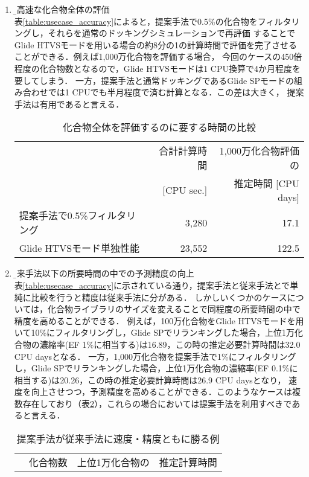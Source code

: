 \begin{enumerate}
\item \b{超高速な化合物全体の評価}\\
	表\ref{table:usecase_accuracy}によると，提案手法で0.5\%の化合物をフィルタリングし，それらを通常のドッキングシミュレーションで再評価
	することでGlide HTVSモードを用いる場合の約8分の1の計算時間で評価を完了させることができる．例えば1,000万化合物を評価する場合，
	今回のケースの450倍程度の化合物数となるので，Glide HTVSモードは1 CPU換算で4か月程度を要してしまう．
	一方，提案手法と通常ドッキングであるGlide SPモードの組み合わせでは1 CPUでも半月程度で済む計算となる．この差は大きく，
	提案手法は有用であると言える．
\begin{table}[htbp] \centering
	\caption{化合物全体を評価するのに要する時間の比較}
	\label{calc_speed_ultrafast}
	\begin{tabular}{l|rr}
	\hline
												&合計計算時間	&1,000万化合物評価の		\\ 
												&[CPU sec.]		&推定時間 [CPU days]		\\ \hline
	提案手法で0.5\%フィルタリング	&3,280				&17.1								\\
	Glide HTVSモード単独性能		&23,552				&122.5								\\ \hline
	\end{tabular}
\end{table}
\item \b{従来手法以下の所要時間の中での予測精度の向上}\\
	表\ref{table:usecase_accuracy}に示されている通り，提案手法と従来手法とで単純に比較を行うと精度は従来手法に分がある．
	しかしいくつかのケースについては，化合物ライブラリのサイズを変えることで同程度の所要時間の中で精度を高めることができる．
	例えば，100万化合物をGlide HTVSモードを用いて10\%にフィルタリングし，Glide SPでリランキングした場合，上位1万化合物の濃縮率(EF 1\%に相当する)は16.89，この時の推定必要計算時間は32.0 CPU daysとなる．
	一方，1,000万化合物を提案手法で1\%にフィルタリングし，Glide SPでリランキングした場合，上位1万化合物の濃縮率(EF 0.1\%に相当する)は20.26，この時の推定必要計算時間は26.9 CPU daysとなり，
	速度を向上させつつ，予測精度を高めることができる．このようなケースは複数存在しており（表\ref{table:win_proposal_case}），これらの場合においては提案手法を利用すべきであると言える．
\begin{table}[htbp] \centering
	\caption{提案手法が従来手法に速度・精度ともに勝る例}
	\label{table:win_proposal_case}
	\begin{tabular}{l|rrr}
	\hline
												&\multirow{2}{*}{化合物数}	&上位1万化合物の		&推定計算時間	\\

\end{tabular}
\end{table}
\end{enumerate}
